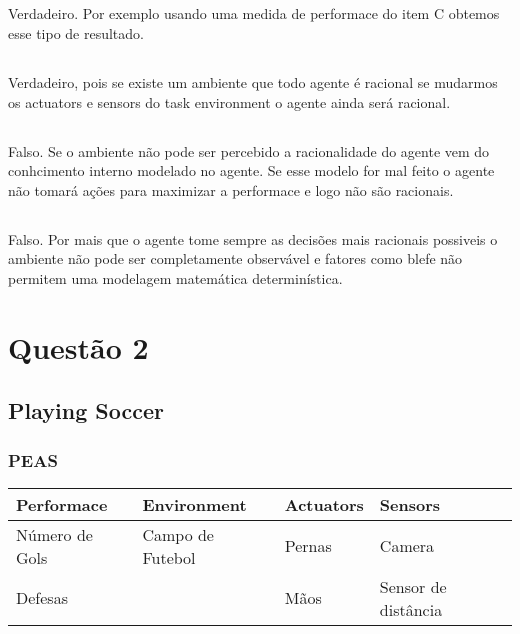 \documentclass[a4paper,12pt]{article}
\begin{document}
\subsection{}

Verdadeiro. Por exemplo usando uma medida de performace do item C obtemos esse tipo de resultado.

\subsection{}

Verdadeiro, pois se existe um ambiente que todo agente é racional se mudarmos os actuators e sensors do task environment o agente ainda será racional.

\subsection{}
Falso. Se o ambiente não pode ser percebido a racionalidade do agente vem do conhcimento interno modelado no agente. Se esse modelo for mal feito o agente não tomará ações para maximizar a performace e logo não são racionais.

\subsection{}

Falso. Por mais que o agente tome sempre as decisões mais racionais possiveis o ambiente não pode ser completamente observável e fatores como blefe não permitem uma modelagem matemática determinística.

\section{Questão 2}
\subsection{Playing Soccer}
\subsubsection{PEAS}
\begin{table}[h!]
\begin{tabular}{l|l|l|l}
\hline
Performace & Environment & Actuators & Sensors \\
\hline
Número de Gols & Campo de Futebol & Pernas & Camera \\
Defesas & & Mãos & Sensor de distância \\
\end{tabular}
\end{table}
\end{document}
